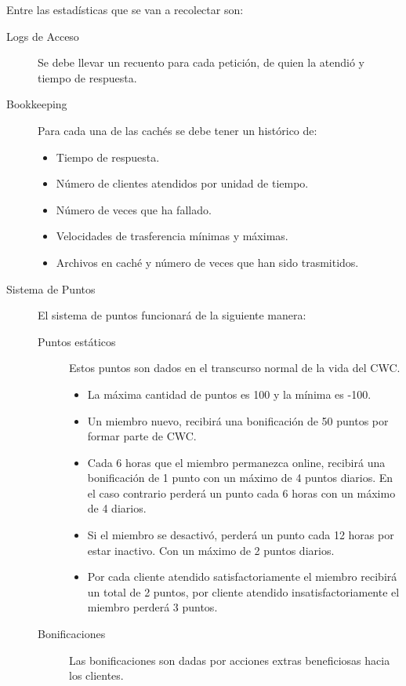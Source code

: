 Entre las estadísticas que se van a recolectar son:

\begin{description}
\item[Logs de Acceso] Se debe llevar un recuento para cada petición, de quien la atendió y tiempo de respuesta.

\item[Bookkeeping] Para cada una de las cachés se debe tener un histórico de:
	\begin{itemize}
	\item Tiempo de respuesta.
	\item Número de clientes atendidos por unidad de tiempo.
	\item Número de veces que ha fallado.
	\item Velocidades de trasferencia mínimas y máximas.
	\item Archivos en caché y número de veces que han sido trasmitidos.
	\end{itemize}
	
\item[Sistema de Puntos] El sistema de puntos funcionará de la siguiente manera:

	\begin{description}
	\item[Puntos estáticos] Estos puntos son dados en el transcurso normal de la vida del CWC.
		\begin{itemize}
		\item La máxima cantidad de puntos es 100 y la mínima es -100.
		\item  Un miembro nuevo, recibirá una bonificación de 50 puntos por formar parte de CWC.
		\item Cada 6 horas que el miembro permanezca online, recibirá una bonificación de 1 punto con un máximo de 4 puntos diarios. En el caso contrario perderá un punto cada 6 horas con un máximo de 4 diarios.
		\item  Si el miembro se desactivó, perderá un punto cada 12 horas por estar inactivo. Con un máximo de 2 puntos diarios.
		\item Por cada cliente atendido satisfactoriamente el miembro recibirá un total de 2 puntos, por cliente atendido insatisfactoriamente el miembro perderá 3 puntos.
		\end{itemize}
		 
	\item[Bonificaciones] Las bonificaciones son dadas por acciones extras beneficiosas hacia los clientes. 
	

\end{description}
\end{description}
